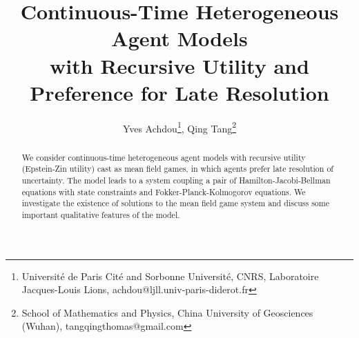 \documentclass[11pt]{article}
\title{Continuous-Time Heterogeneous Agent Models \\with Recursive Utility and Preference for Late Resolution}
\author{Yves Achdou\thanks{Universit\'{e} de Paris Cit\'{e} and Sorbonne Universit\'{e}, CNRS, Laboratoire Jacques-Louis Lions,  achdou@ljll.univ-paris-diderot.fr}, Qing Tang\thanks{School of Mathematics and Physics, China University of Geosciences (Wuhan),  tangqingthomas@gmail.com}}
\date{}
\numberwithin{equation}{section}
\theoremstyle{definition}
\theoremstyle{plain}
\begin{document}
\maketitle

\begin{abstract} 

We consider continuous-time heterogeneous agent models with recursive utility (Epstein-Zin utility) cast as mean field games, in which agents prefer late resolution of uncertainty. The model leads to a system coupling a pair of Hamilton-Jacobi-Bellman equations with state constraints and Fokker-Planck-Kolmogorov equations. We investigate the existence of solutions to the mean field game system and discuss some important qualitative features of the model. 
\end{abstract}
	
	
\end{document}
